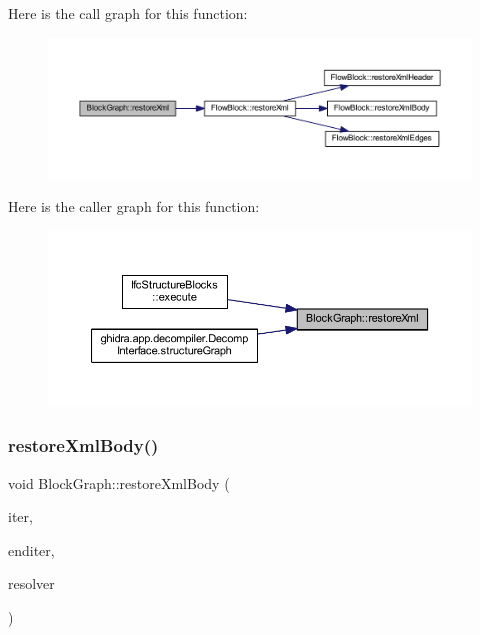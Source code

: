 Here is the call graph for this function\+:
\nopagebreak
\begin{figure}[H]
\begin{center}
\leavevmode
\includegraphics[width=350pt]{class_block_graph_a90d67a53a21174345f5f376c75ca6067_cgraph}
\end{center}
\end{figure}
Here is the caller graph for this function\+:
\nopagebreak
\begin{figure}[H]
\begin{center}
\leavevmode
\includegraphics[width=350pt]{class_block_graph_a90d67a53a21174345f5f376c75ca6067_icgraph}
\end{center}
\end{figure}
\mbox{\label{class_block_graph_a7a1c54e577b11af83f2635f9c5ad0545}} 
\subsubsection{\texorpdfstring{restoreXmlBody()}{restoreXmlBody()}}
{\footnotesize\ttfamily void Block\+Graph\+::restore\+Xml\+Body (\begin{DoxyParamCaption}\item[{List\+::const\+\_\+iterator \&}]{iter,  }\item[{List\+::const\+\_\+iterator}]{enditer,  }\item[{\mbox{\hyperlink{class_block_map}{Block\+Map}} \&}]{resolver }\end{DoxyParamCaption})\hspace{0.3cm}{\ttfamily [virtual]}}



